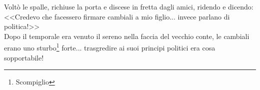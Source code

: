 \indent Voltò le spalle, richiuse la porta e discese in fretta dagli amici, ridendo e dicendo: <<Credevo che facessero firmare cambiali a mio figlio... invece parlano di politica!>>\\
\indent Dopo il temporale era venuto il sereno nella faccia del vecchio conte, le cambiali erano uno sturbo\footnote{Scompiglio} forte... trasgredire ai suoi principi politici era cosa sopportabile!

